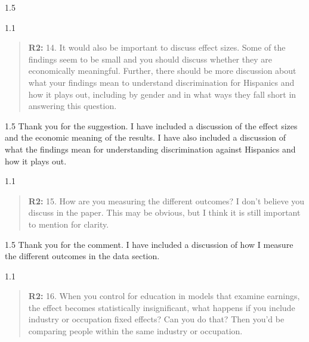 \documentclass[12pt,english]{article}
\newcommand{\rrquote}{1.1}
\newcommand{\rrxspc}{1.5}
\begin{document}
\begin{refsection}
\begin{spacing}{\rrxspc}
    \end{spacing}

    \begin{spacing}{\rrquote}
        \begin{quotation}
        \textbf{R2: } 14. It would also be important to discuss effect sizes. Some of the findings seem to be small and you should discuss whether they are economically meaningful. Further, there should be more discussion about what your findings mean to understand discrimination for Hispanics and how it plays out, including by gender and in what ways they fall short in answering this question.
              
        \end{quotation}
        \end{spacing}
        
        \begin{spacing}{\rrxspc}
            Thank you for the suggestion. I have included a discussion of the effect sizes and the economic meaning of the results. I have also included a discussion of what the findings mean for understanding discrimination against Hispanics and how it plays out.
    \end{spacing}

    \begin{spacing}{\rrquote}
        \begin{quotation}
        \textbf{R2: } 15. How are you measuring the different outcomes? I don’t believe you discuss in the paper. This may be obvious, but I think it is still important to mention for clarity.
              
        \end{quotation}
        \end{spacing}
    
        \begin{spacing}{\rrxspc}
            Thank you for the comment. I have included a discussion of how I measure the different outcomes in the data section.        
    \end{spacing}

    \begin{spacing}{\rrquote}
        \begin{quotation}
        \textbf{R2: } 16. When you control for education in models that examine earnings, the effect becomes statistically insignificant, what happens if you include industry or occupation fixed effects? Can you do that? Then you'd be comparing people within the same industry or occupation.
              

\end{quotation}
\end{spacing}
\end{refsection}
\end{document}
